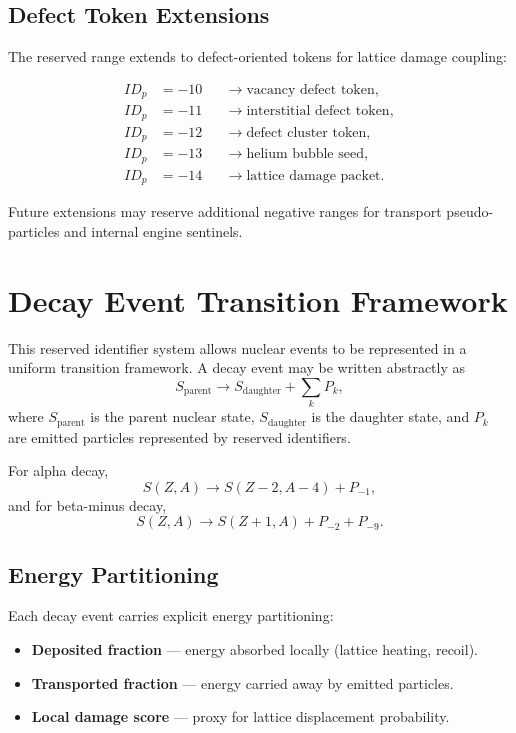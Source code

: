 \documentclass[11pt,a4paper]{article}
\begin{document}
\subsection{Defect Token Extensions}

The reserved range extends to defect-oriented tokens for lattice damage coupling:

\[
\begin{aligned}
ID_p &= -10  &&\rightarrow \text{vacancy defect token},\\
ID_p &= -11  &&\rightarrow \text{interstitial defect token},\\
ID_p &= -12  &&\rightarrow \text{defect cluster token},\\
ID_p &= -13  &&\rightarrow \text{helium bubble seed},\\
ID_p &= -14  &&\rightarrow \text{lattice damage packet}.
\end{aligned}
\]

Future extensions may reserve additional negative ranges for transport pseudo-particles and internal engine sentinels.

\section{Decay Event Transition Framework}
\label{sec:decay-event}

This reserved identifier system allows nuclear events to be represented in a uniform transition framework. A decay event may be written abstractly as
\[
S_{\text{parent}} \rightarrow S_{\text{daughter}} + \sum_k P_k,
\]
where $S_{\text{parent}}$ is the parent nuclear state, $S_{\text{daughter}}$ is the daughter state, and $P_k$ are emitted particles represented by reserved identifiers.

For alpha decay,
\[
S(Z,A) \rightarrow S(Z-2,A-4) + P_{-1},
\]
and for beta-minus decay,
\[
S(Z,A) \rightarrow S(Z+1,A) + P_{-2} + P_{-9}.
\]

\subsection{Energy Partitioning}

Each decay event carries explicit energy partitioning:
\begin{itemize}
    \item \textbf{Deposited fraction} --- energy absorbed locally (lattice heating, recoil).
    \item \textbf{Transported fraction} --- energy carried away by emitted particles.
    \item \textbf{Local damage score} --- proxy for lattice displacement probability.
\end{itemize}
\end{document}
